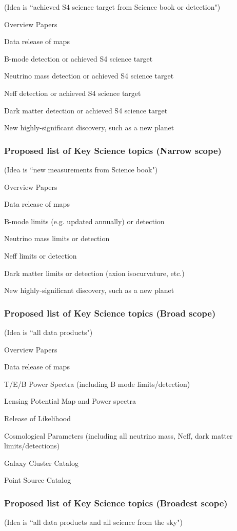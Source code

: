 (Idea is ``achieved S4 science target from Science book or detection")

Overview Papers

Data release of maps

B-mode detection or achieved S4 science target

Neutrino mass detection or achieved S4 science target

Neff detection or achieved S4 science target

Dark matter detection or achieved S4 science target 

New highly-significant discovery, such as a new planet

\subsubsection{Proposed list of Key Science topics (Narrow scope)} 

(Idea is ``new measurements from Science book")

Overview Papers

Data release of maps

B-mode limits (e.g. updated annually) or detection

Neutrino mass limits or detection

Neff limits or detection

Dark matter limits or detection (axion isocurvature, etc.)

New highly-significant discovery, such as a new planet

\subsubsection{Proposed list of Key Science topics (Broad scope)}

(Idea is ``all data products")

Overview Papers

Data release of maps

T/E/B Power Spectra (including B mode limits/detection)

Lensing Potential Map and Power spectra

Release of Likelihood

Cosmological Parameters (including all neutrino mass, Neff, dark matter limits/detections)

Galaxy Cluster Catalog

Point Source Catalog

\subsubsection{Proposed list of Key Science topics (Broadest scope)}
(Idea is ``all data products and all science from the sky")

